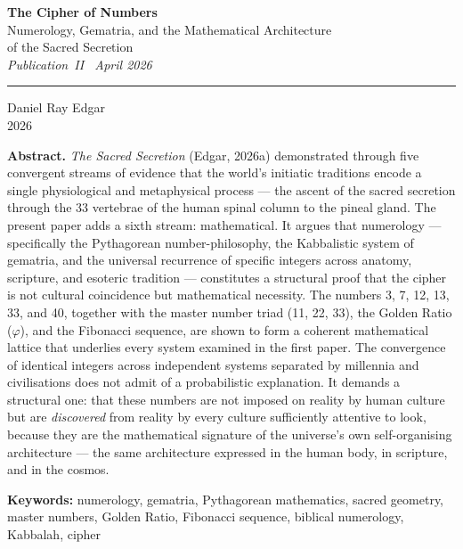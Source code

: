 \documentclass[12pt, a4paper]{article}
\begin{document}

\begin{titlepage}
  \centering
  \vspace*{2cm}

  {\LARGE\bfseries The Cipher of Numbers}\\[0.8em]
  {\large Numerology, Gematria, and the Mathematical Architecture\\
  of the Sacred Secretion}\\[0.4em]
  {\normalsize\itshape Publication~II \textbullet\ April 2026}

  \vspace{2cm}
  \rule{0.5\linewidth}{0.5pt}
  \vspace{2cm}

  {\large Daniel Ray Edgar}\\[0.4em]
  {\normalsize 2026}

  \vfill

  \noindent\textbf{Abstract.}\quad
  \emph{The Sacred Secretion} (Edgar, 2026a) demonstrated through five
  convergent streams of evidence that the world's initiatic traditions encode
  a single physiological and metaphysical process — the ascent of the sacred
  secretion through the 33 vertebrae of the human spinal column to the pineal
  gland. The present paper adds a sixth stream: mathematical. It argues that
  numerology — specifically the Pythagorean number-philosophy, the Kabbalistic
  system of gematria, and the universal recurrence of specific integers across
  anatomy, scripture, and esoteric tradition — constitutes a structural proof
  that the cipher is not cultural coincidence but mathematical necessity. The
  numbers 3, 7, 12, 13, 33, and 40, together with the master number triad
  (11, 22, 33), the Golden Ratio ($\varphi$), and the Fibonacci sequence,
  are shown to form a coherent mathematical lattice that underlies every system
  examined in the first paper. The convergence of identical integers across
  independent systems separated by millennia and civilisations does not admit
  of a probabilistic explanation. It demands a structural one: that these
  numbers are not imposed on reality by human culture but are \emph{discovered}
  from reality by every culture sufficiently attentive to look, because they
  are the mathematical signature of the universe's own self-organising
  architecture — the same architecture expressed in the human body, in
  scripture, and in the cosmos.

  \vspace{0.5cm}
  \noindent\textbf{Keywords:} numerology, gematria, Pythagorean mathematics,
  sacred geometry, master numbers, Golden Ratio, Fibonacci sequence,
  biblical numerology, Kabbalah, cipher

\end{titlepage}
\end{document}
